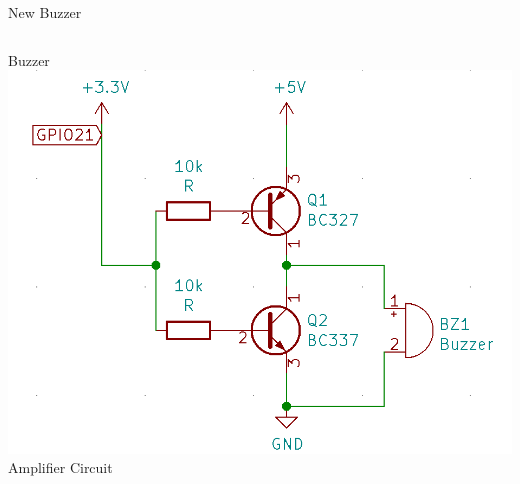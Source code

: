 \documentclass[t]{beamer}
\begin{document}
\begin{frame}{New Buzzer}
\begin{columns}[T]
\begin{column}{0.4\textwidth}
            Buzzer\\
            \vspace*{1em}
            \includegraphics[width=\textwidth]{../thesis/images/buzzer-schema.png} \\
            Amplifier Circuit
        \end{column}
    \end{columns}
\end{frame}
\end{document}
